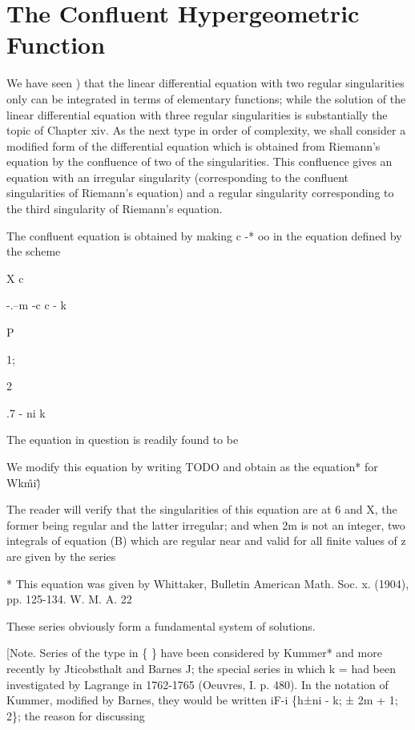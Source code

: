 \chapter{The Confluent Hypergeometric Function}


We have seen ) that the linear differential equation with two
regular singularities only can be integrated in terms of elementary
functions; while the solution of the linear differential equation
with three regular singularities is substantially the topic of Chapter
xiv. As the next type in order of complexity, we shall consider a
modified form of the differential equation which is obtained from
Riemann's equation by the confluence of two of the singularities. This
confluence gives an equation with an irregular singularity
(corresponding to the confluent singularities of Riemann's equation)
and a regular singularity corresponding to the third singularity of
Riemann's equation.

The confluent equation is obtained by making c -* oo in the equation
defined by the scheme

X c

-.--m -c c - k

P

1;

2

.7 - ni k

The equation in question is readily found to be

We modify this equation by writing TODO and obtain as the equation*
for Wk\^mi\^)

The reader will verify that the singularities of this equation are at
6 and X, the former being regular and the latter irregular; and when
2m is not an integer, two integrals of equation (B) which are regular
near and valid for all finite values of z are given by the series

* This equation was given by Whittaker, Bulletin American Math. Soc.
x. (1904), pp. 125-134. W. M. A. 22

%
%

These series obviously form a fundamental system of solutions.

[Note. Series of the type in \{ \} have been considered by Kummer* and
more recently by Jticobsthalt and Barnes J; the special series in
which k = had been investigated by Lagrange in 1762-1765 (Oeuvres, I.
p. 480). In the notation of Kummer, modified by Barnes, they would be
written iF-i \{h±ni - k; ± 2m + 1; 2\}; the reason for discussing

